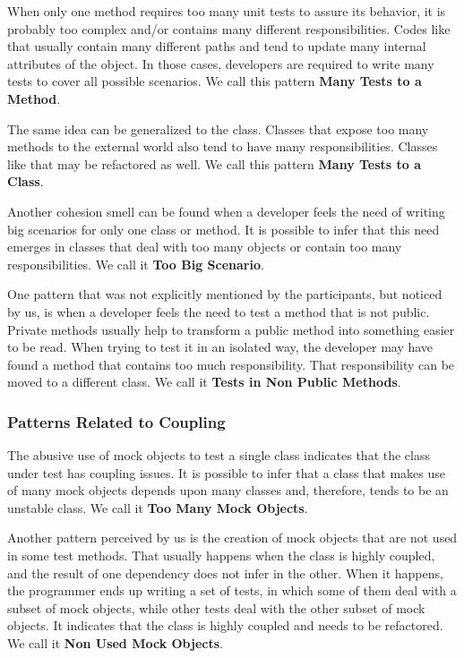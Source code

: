 \documentclass[times]{elsarticle}
\begin{document}
When only one method requires too many unit tests to assure its behavior,
it is probably too complex and/or contains many different responsibilities.
Codes like that usually contain many different paths and tend to update
many internal attributes of the object. In those cases, developers
are required to write many tests to cover all possible scenarios.
We call this pattern \textbf{Many Tests to a Method}.

The same idea can be generalized to the class. Classes that expose too 
many methods to the external world also tend to have many responsibilities.
Classes like that may be refactored as well.
We call this pattern \textbf{Many Tests to a Class}.

Another cohesion smell can be found when a developer feels the need
of writing big scenarios for only one class or method. It is possible to infer
that this need emerges in classes that deal with too many objects or
contain too many responsibilities. We call it \textbf{Too Big Scenario}.

One pattern that was not explicitly mentioned by the participants, but
noticed by us, is when a developer feels the need to test a method
that is not public. Private methods usually help to transform a public method
into something easier to be read. When trying to test it in an isolated
way, the developer may have found a method that contains too much responsibility.
That responsibility can be moved to a different class. We call it \textbf{Tests in Non Public Methods}.

\subsubsection{Patterns Related to Coupling}

The abusive use of mock objects to test a single class indicates that
the class under test has coupling issues. It is possible to infer that a class
that makes use of many mock objects depends upon many classes and, therefore,
tends to be an unstable class. We call it \textbf{Too Many Mock Objects}.

Another pattern perceived by us is the creation of mock objects that are
not used in some test methods. That usually happens when the class
is highly coupled, and the result of one dependency does not infer in
the other. When it happens, the programmer ends up writing a set of tests,
in which some of them deal with a subset of mock objects, while other
tests deal with the other subset of mock objects. It indicates that
the class is highly coupled and needs to be refactored. We call it
\textbf{Non Used Mock Objects}.
\end{document}
